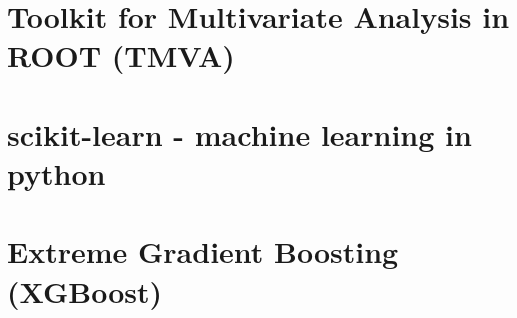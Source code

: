 \section{Toolkit for Multivariate Analysis in ROOT (TMVA)}
\label{ch:Algorithmen:sec:TMVA}

\section{scikit-learn - machine learning in python}
\label{ch:Algorithmen:sec:sklearn}

\section{Extreme Gradient Boosting (XGBoost)}
\label{ch:Algorithmen:sec:XGB}
